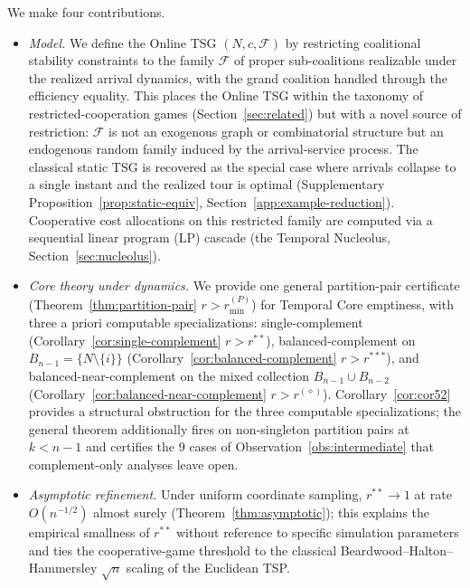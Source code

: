\documentclass[11pt]{article}
\theoremstyle{plain}
\theoremstyle{definition}
\theoremstyle{remark}
\newcommand{\F}{\mathcal{F}}
\begin{document}
We make four contributions.
\begin{itemize}[leftmargin=1.5em]
\item[\textbf{C1.}] \emph{Model.} We define the Online TSG $(N, c, \F)$ by restricting coalitional stability constraints to the family $\F$ of proper sub-coalitions realizable under the realized arrival dynamics, with the grand coalition handled through the efficiency equality. This places the Online TSG within the taxonomy of restricted-cooperation games (Section~\ref{sec:related}) but with a novel source of restriction: $\F$ is not an exogenous graph or combinatorial structure but an endogenous random family induced by the arrival-service process. The classical static TSG is recovered as the special case where arrivals collapse to a single instant and the realized tour is optimal (Supplementary Proposition~\ref{prop:static-equiv}, Section~\ref{app:example-reduction}). Cooperative cost allocations on this restricted family are computed via a sequential linear program (LP) cascade (the Temporal Nucleolus, Section~\ref{sec:nucleolus}).
\item[\textbf{C2.}] \emph{Core theory under dynamics.} We provide one general partition-pair certificate (Theorem~\ref{thm:partition-pair} $r>r^{(P)}_{\min}$) for Temporal Core emptiness, with three a priori computable specializations: single-complement (Corollary~\ref{cor:single-complement} $r>r^{\ast\ast}$), balanced-complement on $B_{n-1}=\{N\setminus\{i\}\}$ (Corollary~\ref{cor:balanced-complement} $r>r^{\ast\ast\ast}$), and balanced-near-complement on the mixed collection $B_{n-1}\cup B_{n-2}$ (Corollary~\ref{cor:balanced-near-complement} $r>r^{(\diamond)}$). Corollary~\ref{cor:cor52} provides a structural obstruction for the three computable specializations; the general theorem additionally fires on non-singleton partition pairs at $k<n-1$ and certifies the 9 cases of Observation~\ref{obs:intermediate} that complement-only analyses leave open.
\item[\textbf{C3.}] \emph{Asymptotic refinement.} Under uniform coordinate sampling, $r^{\ast\ast}\to 1$ at rate $O(n^{-1/2})$ almost surely (Theorem~\ref{thm:asymptotic}); this explains the empirical smallness of $r^{\ast\ast}$ without reference to specific simulation parameters and ties the cooperative-game threshold to the classical Beardwood--Halton--Hammersley $\sqrt{n}$ scaling of the Euclidean TSP.

\end{itemize}
\end{document}
